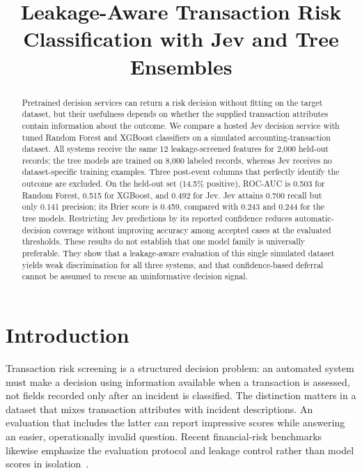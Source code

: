 \documentclass{llncs}
\begin{document}
\title{Leakage-Aware Transaction Risk Classification with Jev and Tree Ensembles}
\author{}
\institute{}
\maketitle

\begin{abstract}
Pretrained decision services can return a risk decision without fitting on the target dataset, but their usefulness depends on whether the supplied transaction attributes contain information about the outcome. We compare a hosted Jev decision service with tuned Random Forest and XGBoost classifiers on a simulated accounting-transaction dataset. All systems receive the same 12 leakage-screened features for 2,000 held-out records; the tree models are trained on 8,000 labeled records, whereas Jev receives no dataset-specific training examples. Three post-event columns that perfectly identify the outcome are excluded. On the held-out set (14.5\% positive), ROC-AUC is 0.503 for Random Forest, 0.515 for XGBoost, and 0.492 for Jev. Jev attains 0.700 recall but only 0.141 precision; its Brier score is 0.459, compared with 0.243 and 0.244 for the tree models. Restricting Jev predictions by its reported confidence reduces automatic-decision coverage without improving accuracy among accepted cases at the evaluated thresholds. These results do not establish that one model family is universally preferable. They show that a leakage-aware evaluation of this single simulated dataset yields weak discrimination for all three systems, and that confidence-based deferral cannot be assumed to rescue an uninformative decision signal.

\end{abstract}

\section{Introduction}

Transaction risk screening is a structured decision problem: an automated system must make a decision using information available when a transaction is assessed, not fields recorded only after an incident is classified. The distinction matters in a dataset that mixes transaction attributes with incident descriptions. An evaluation that includes the latter can report impressive scores while answering an easier, operationally invalid question. Recent financial-risk benchmarks likewise emphasize the evaluation protocol and leakage control rather than model scores in isolation~\cite{mishra2026erp,zeng2026fraudbench}.
\end{document}
